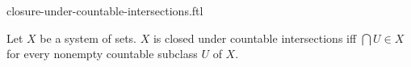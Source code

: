 \documentclass{naproche-library}
\begin{document}
\begin{smodule}[title=Closure Under Countable Intersections]{closure-under-countable-intersections.ftl}

\begin{definition}[forthel,id=FOUNDATIONS_14_451771879129088]
  Let $X$ be a system of sets.
  $X$ is closed under countable intersections iff $\bigcap U \in X$ for every nonempty countable subclass $U$ of $X$.
\end{definition}
\end{smodule}
\end{document}
